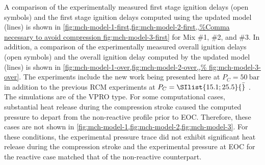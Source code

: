 \documentclass[../main.tex]{subfiles}
\begin{document}
A comparison of the experimentally measured first stage ignition delays (open
symbols) and the first stage ignition delays computed using the updated model
(lines) is shown in \cref{fig:mch-model-1-first,fig:mch-model-2-first,,%
fig:mch-model-3-first} for Mix \#1, \#2, and \#3. In
addition, a comparison of the experimentally measured overall ignition delays
(open symbols) and the overall ignition delay computed by the updated model
(lines) is shown in \cref{fig:mch-model-1-over,fig:mch-model-2-over,,%
fig:mch-model-3-over}. The experiments include the new work being
presented here at $P_C=\SI{50}{\bar}$ in addition to the previous RCM experiments at
$P_C=\SIlist{15.1;25.5}{\bar}$ \cite{Mittal2009}. The simulations are of
the VPRO type. For some computational cases, substantial heat release during
the compression stroke caused the computed pressure to depart from the
non-reactive profile prior to EOC. Therefore, these cases are not shown in
\cref{fig:mch-model-1,fig:mch-model-2,fig:mch-model-3}. For these conditions, the
experimental pressure trace did not exhibit significant heat release during
the compression stroke and the experimental pressure at EOC for the reactive
case matched that of the non-reactive counterpart.
\end{document}
